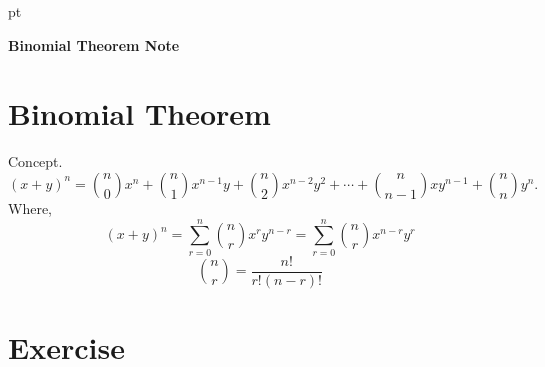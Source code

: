 \documentclass[12pt]{article}
\begin{document}
 pt
\begin{center}
	{\large \bf Binomial Theorem Note}\\
	\vspace{2 mm}

\end{center}
\vspace{0.05cm}

\section{\textbf{Binomial Theorem}}
Concept.$$(x+y)^n=\binom{n}{0}x^n+\binom{n}{1}x^{n-1}y+\binom{n}{2}x^{n-2}y^2+\cdots+\binom{n}{n-1}xy^{n-1}+\binom{n}{n}y^n.$$
Where,$$(x+y)^n=\sum_{r=0}^n\binom{n}{r}x^ry^{n-r}=\sum_{r=0}^n\binom{n}{r}x^{n-r}y^r$$ 
$$\binom{n}{r}=\dfrac{n!}{r!(n-r)!}$$




\section{\textbf{Exercise}}
\end{document}

